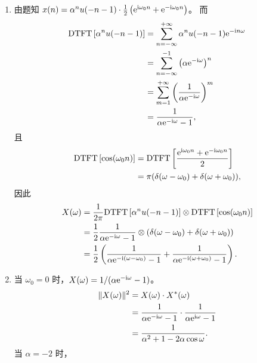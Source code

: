 \begin{solution}
    \begin{enumerate}[label=(\arabic*)]
        \item 由题知 $x(n) = \alpha^nu(-n-1) \cdot \frac{1}{2}\left(\mathrm{e}^{\mathrm{i}\omega_0 n} + \mathrm{e}^{-\mathrm{i} \omega_0 n}\right)$。
            而
            \begin{align*}
                \mathrm{DTFT}\left[\alpha^nu(-n-1)\right] & = \sum_{n = -\infty}^{+\infty}\alpha^nu(-n-1)\mathrm{e}^{-\mathrm{i} n\omega} \\
                & = \sum_{n = -\infty}^{-1}\left(\alpha\mathrm{e}^{-\mathrm{i}\omega}\right)^n \\
                & = \sum_{m = 1}^{+\infty}\left(\frac{1}{\alpha\mathrm{e}^{-\mathrm{i}\omega}}\right)^m \\
                & = \frac{1}{\alpha \mathrm{e}^{-\mathrm{i}\omega} - 1},
            \end{align*}
            且
            \begin{align*}
                \mathrm{DTFT}\left[\cos(\omega_0 n)\right] & = \mathrm{DTFT}\left[\frac{\mathrm{e}^{\mathrm{i}\omega_0 n} + \mathrm{e}^{-\mathrm{i}\omega_0 n}}{2}\right] \\
                & = \pi(\delta(\omega - \omega_0) + \delta(\omega + \omega_0)),
            \end{align*}
            因此
            \begin{align*}
                X(\omega) & = \frac{1}{2\pi}\mathrm{DTFT}\left[\alpha^nu(-n-1)\right] \otimes \mathrm{DTFT}\left[\cos(\omega_0 n)\right] \\
                & = \frac{1}{2}\frac{1}{\alpha \mathrm{e}^{-\mathrm{i}\omega} - 1} \otimes (\delta(\omega - \omega_0) + \delta(\omega + \omega_0)) \\
                & = \frac{1}{2}\left(\frac{1}{\alpha \mathrm{e}^{-\mathrm{i}(\omega - \omega_0)} - 1} + \frac{1}{\alpha \mathrm{e}^{-\mathrm{i}(\omega + \omega_0)} - 1}\right).
            \end{align*}
        \item 当 $\omega_0 = 0$ 时，$X(\omega) = 1/(\alpha\mathrm{e}^{-\mathrm{i}\omega} - 1)$。
            \begin{align*}
                \|X(\omega)\|^2 & = X(\omega)\cdot X^*(\omega) \\
                & = \frac{1}{\alpha\mathrm{e}^{-\mathrm{i}\omega} - 1} \cdot \frac{1}{\alpha\mathrm{e}^{\mathrm{i}\omega} - 1} \\
                & = \frac{1}{\alpha^2 + 1 - 2\alpha\cos\omega}.
            \end{align*}
            当 $\alpha = -2$ 时，
            \begin{align*}

\end{align*}
\end{enumerate}
\end{solution}

